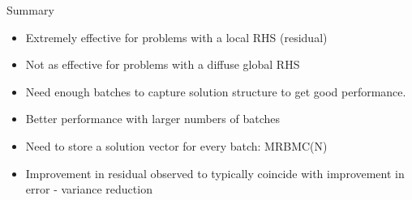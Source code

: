 \documentclass{beamer}
\begin{document}
\begin{frame}{Summary}

  \begin{itemize}
  \item Extremely effective for problems with a local RHS (residual)
  \item Not as effective for problems with a diffuse global RHS
  \item Need enough batches to capture solution structure to get good
    performance.
  \item Better performance with larger numbers of batches
  \item Need to store a solution vector for every batch: MRBMC(N)
  \item Improvement in residual observed to typically coincide with
    improvement in error - variance reduction
  \end{itemize}

\end{frame}

\end{document}
